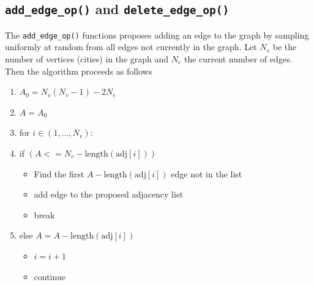 \documentclass[11pt,a4paper]{article}
\providecommand{\tightlist}{%
  \setlength{\itemsep}{0pt}\setlength{\parskip}{0pt}}
\numberwithin{equation}{section}
\begin{document}
\hypertarget{add_edge_op-and-delete_edge_op}{%
\subsection{\texorpdfstring{\texttt{add\_edge\_op()} and
\texttt{delete\_edge\_op()}}{add\_edge\_op() and delete\_edge\_op()}}\label{add_edge_op-and-delete_edge_op}}

The \texttt{add\_edge\_op()} functions proposes adding an edge to the
graph by sampling uniformly at random from all edges not currently in
the graph. Let \(N_v\) be the number of vertices (cities) in the graph
and \(N_e\) the current number of edges. Then the algorithm proceeds as
follows 

\begin{enumerate}
\def\labelenumi{\arabic{enumi}.}
\tightlist
\item
  \(A_0 = N_v(N_v-1) - 2N_e\)
\item
  \(A = A_0\)
\item
  for \(i \in (1,\dots,N_v)\):
\item
  if \((A <= N_v - \text{length}(\text{adj}[i]))\)

  \begin{itemize}
  \tightlist
  \item
    Find the first \(A - \text{length}(\text{adj}[i])\) edge not in the
    list
  \item
    add edge to the proposed adjacency list
  \item
    break
  \end{itemize}
\item
  else \(A = A-\text{length}(\text{adj}[i])\)

  \begin{itemize}
  \tightlist
  \item
    \(i = i + 1\)
  \item
    continue
  \end{itemize}
\end{enumerate}
\end{document}
